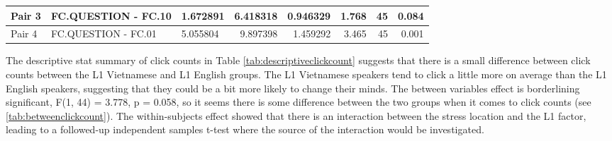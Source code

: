 \documentclass[a4paper]{article}
\begin{document}
\begin{table}[H]
\begin{center}
\begin{tabular}{|l|l|l|r|r|r|r|r|}
\hline
Pair 3 & FC.QUESTION - FC.10  & 1.672891                                   & 6.418318                                             & 0.946329                                              & 1.768                                   & 45                                       & 0.084                                                  \\ 
\hline
Pair 4 & FC.QUESTION - FC.01  & 5.055804                                   & 9.897398                                             & 1.459292                                              & 3.465                                   & 45                                       & 0.001                                                  \\
\hline
\end{tabular}
\end{center}
\end{table}


The descriptive stat summary of click counts in Table \ref{tab:descriptiveclickcount} suggests that there is a small difference between click counts between the L1 Vietnamese and L1 English groups. The L1 Vietnamese speakers tend to click a little more on average than the L1 English speakers, suggesting that they could be a bit more likely to change their minds. The between variables effect is borderlining significant, F(1, 44) = 3.778, p = 0.058, so it seems there is some difference between the two groups when it comes to click counts (see \ref{tab:betweenclickcount}). The within-subjects effect showed that there is an interaction between the stress location and the L1 factor, leading to a followed-up independent samples t-test where the source of the interaction would be investigated.
\end{document}
